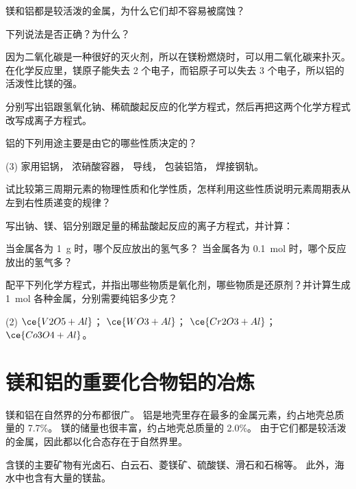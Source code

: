\begin{Practice}[习题]
\begin{question}
  \item 镁和铝都是较活泼的金属，为什么它们却不容易被腐蚀？
  \item 下列说法是否正确？为什么？
  \begin{tasks}[label=(\arabic*)]
    \task 因为二氧化碳是一种很好的灭火剂，所以在镁粉燃烧时，可以用二氧化碳来扑灭。
    \task 在化学反应里，镁原子能失去 2 个电子，而铝原子可以失去 3 个电子，所以铝的活泼性比镁的强。
  \end{tasks}
  \item 分别写出铝跟氢氧化钠、稀硫酸起反应的化学方程式，然后再把这两个化学方程式改写成离子方程式。
  \item 铝的下列用途主要是由它的哪些性质决定的？
  \begin{tasks}(3)
    \task 家用铝锅，
    \task 浓硝酸容器，
    \task 导线，
    \task 包装铝箔，
    \task 焊接钢轨。
  \end{tasks}
  \item 试比较第三周期元素的物理性质和化学性质，怎样利用这些性质说明元素周期表从左到右性质递变的规律？
  \item 写出钠、镁、铝分别跟足量的稀盐酸起反应的离子方程式，并计算：
  \begin{tasks}[label=(\arabic*)]
    \task 当金属各为 \qty{1}{g} 时，哪个反应放出的氢气多？
    \task 当金属各为 \qty{0.1}{mol} 时，哪个反应放出的氢气多？
  \end{tasks}
  \item 配平下列化学方程式，并指出哪些物质是氧化剂，哪些物质是还原剂？并计算生成 \qty{1}{mol} 各种金属，分别需要纯铝多少克？
  \begin{tasks}(2)
    \task $\ce{ V2O5  + Al }$；
    \task $\ce{ WO3   + Al }$；
    \task $\ce{ Cr2O3 + Al }$；
    \task $\ce{ Co3O4 + Al }$。
  \end{tasks}
\end{question}
\end{Practice}


\section{镁和铝的重要化合物\texorpdfstring{\quad}{ }铝的冶炼}
镁和铝在自然界的分布都很广。
铝是地壳里存在最多的金属元素，约占地壳总质量的 7.7\%。
镁的储量也很丰富，约占地壳总质量的 2.0\%。
由于它们都是较活泼的金属，因此都以化合态存在于自然界里。

含镁的主要矿物有光卤石、白云石、菱镁矿、硫酸镁、滑石和石棉等。
此外，海水中也含有大量的镁盐。

